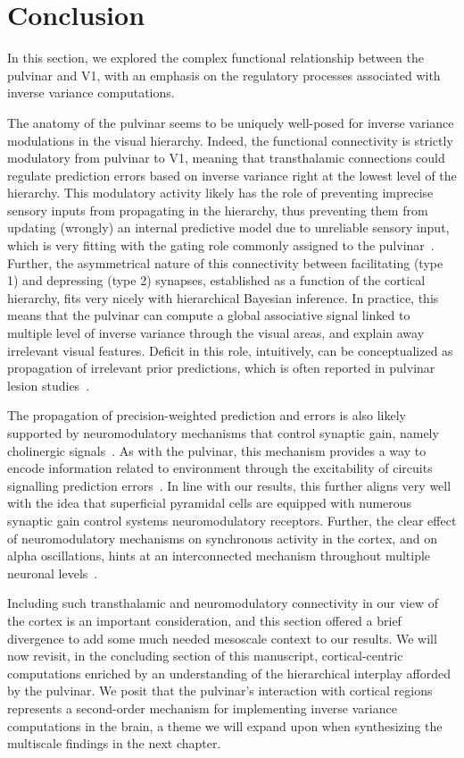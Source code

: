 \section{Conclusion}
In this section, we explored the complex functional relationship between the pulvinar and \gls{V1}, with an emphasis on the regulatory processes associated with inverse variance computations. 

The anatomy of the pulvinar seems to be uniquely well-posed for inverse variance modulations in the visual hierarchy. Indeed, the functional connectivity is strictly modulatory from pulvinar to \gls{V1}, meaning that transthalamic connections could regulate prediction errors based on inverse variance right at the lowest level of the hierarchy. This modulatory activity likely has the role of preventing imprecise sensory inputs from propagating in the hierarchy, thus preventing them from updating (wrongly) an internal predictive model due to unreliable sensory input, which is very fitting with the gating role commonly assigned to the pulvinar~\cite{purushothaman2012gating}. Further, the asymmetrical nature of this connectivity between facilitating (type 1) and depressing (type 2) synapses, established as a function of the cortical hierarchy, fits very nicely with hierarchical Bayesian inference. In practice, this means that the pulvinar can compute a global associative signal linked to multiple level of inverse variance through the visual areas, and explain away irrelevant visual features. Deficit in this role, intuitively, can be conceptualized as propagation of irrelevant prior predictions, which is often reported in pulvinar lesion studies~\cite{robinson1992pulvinar}. 

The propagation of precision-weighted prediction and errors is also likely supported by neuromodulatory mechanisms that control synaptic gain, namely cholinergic signals~\cite{moran2013free}. As with the pulvinar, this mechanism provides a way to encode information related to environment through the excitability of circuits signalling prediction errors~\cite{keller2012sensorimotor}. In line with our results, this further aligns very well with the idea that superficial pyramidal cells are equipped with numerous synaptic gain control systems neuromodulatory receptors. Further, the clear effect of neuromodulatory mechanisms on synchronous activity in the cortex, and on alpha oscillations, hints at an interconnected mechanism throughout multiple neuronal levels~\cite{brown2007abnormal}.

Including such transthalamic and neuromodulatory connectivity in our view of the cortex is an important consideration, and this section offered a brief divergence to add some much needed mesoscale context to our results. We will now revisit, in the concluding section of this manuscript, cortical-centric computations enriched by an understanding of the hierarchical interplay afforded by the pulvinar. We posit that the pulvinar's interaction with cortical regions represents a second-order mechanism for implementing inverse variance computations in the brain, a theme we will expand upon when synthesizing the multiscale findings in the next chapter.

